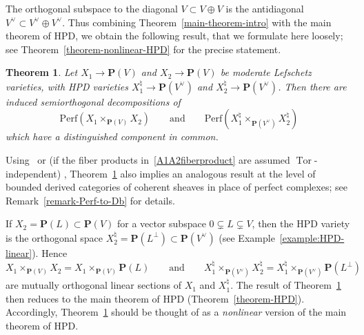 \documentclass[11pt, reqno]{amsart}
\numberwithin{equation}{section}
\theoremstyle{plain}
\newtheorem{theorem}{Theorem}[section]
\theoremstyle{definition}
\newcommand{\Perf}{\mathrm{Perf}}
\newcommand{\hpd}{{\natural}}
\newcommand{\svee}{\scriptscriptstyle\vee}
\newcommand{\vV}{V^{\svee}}
\DeclareMathOperator{\Tor}{Tor}
\newcommand{\bP}{\mathbf{P}}
\begin{document}
The orthogonal subspace to the diagonal $V \subset V \oplus V$ is the antidiagonal 
$V^{\svee} \subset V^{\svee} \oplus V^{\svee}$. 
Thus combining Theorem~\ref{main-theorem-intro} with the main theorem of HPD, 
we obtain the following result, that we formulate here loosely; 
see Theorem~\ref{theorem-nonlinear-HPD} for the precise statement. 

\begin{theorem}
\label{intro-nonlinear-HPD}
Let $X_1 \to \bP({V})$ and $X_2 \to \bP({V})$ be moderate Lefschetz varieties, with HPD varieties $X^\hpd_1 \to \bP({\vV})$ and $X^\hpd_2 \to \bP({\vV})$.  
Then there are induced semiorthogonal decompositions of 
\begin{equation}
\label{A1A2fiberproduct}
\Perf{ ( X_1 \times_{\bP(V)} X_2 )}
\qquad \text{and} \qquad 
\Perf{ ( X^\hpd_1 \times_{\bP(\vV)} X^\hpd_2 )}
\end{equation}
which have a distinguished component in common. 
\end{theorem}

Using~\cite{bznp} or (if the fiber products in~\eqref{A1A2fiberproduct} are assumed $\Tor$-independent) \cite{kuznetsov-base-change}, 
Theorem~\ref{intro-nonlinear-HPD} also implies an analogous result at the level 
of bounded derived categories of coherent sheaves in place of perfect complexes; 
see Remark~\ref{remark-Perf-to-Db} for details.

If $X_2 = \bP(L) \subset \bP(V)$ for a vector subspace 
$0 \subsetneq L \subsetneq V$, then the HPD variety is the 
orthogonal space $X^\hpd_2 = \bP(L^{\perp}) \subset \bP(\vV)$ (see Example~\ref{example:HPD-linear}). 
Hence 
\begin{equation*}
X_1 \times_{\bP(V)} X_2 = X_1 \times_{\bP(V)} \bP(L)
\qquad\text{and}\qquad 
X^\hpd_1 \times_{\bP(\vV)} X^\hpd_2 = X^\hpd_1 \times_{\bP(\vV)} \bP(L^\perp)
\end{equation*}
are mutually orthogonal linear sections of $X_1$ and $X^\hpd_1$.
The result of Theorem~\ref{intro-nonlinear-HPD} then reduces to the main theorem of HPD (Theorem~\ref{theorem-HPD}).
Accordingly, Theorem~\ref{intro-nonlinear-HPD} should be thought of as a \emph{nonlinear} version of the main theorem of HPD.
\end{document}
